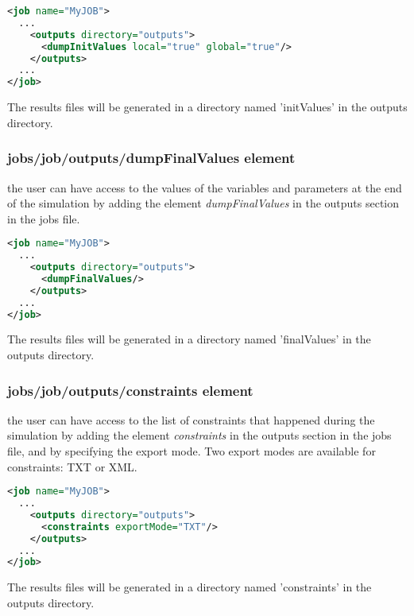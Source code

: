 \documentclass[a4paper, 12pt]{report}
\begin{document}
\begin{lstlisting}[language=XML, morekeywords={dumpInitValues},numbers=none]
<job name="MyJOB">
  ...
    <outputs directory="outputs">
      <dumpInitValues local="true" global="true"/>
    </outputs>
  ...
</job>
\end{lstlisting}

The results files will be generated in a directory named 'initValues' in the outputs directory.

\subsubsection{jobs/job/outputs/dumpFinalValues element}
\label{DynawoInputFiles_inputs_jobs_job_outputs_dumpFinalValues}

the user can have access to the values of the variables and parameters at the end of the simulation by adding the element \textit{dumpFinalValues} in the outputs section in the jobs file.


\begin{lstlisting}[language=XML, morekeywords={dumpFinalValues},numbers=none]
<job name="MyJOB">
  ...
    <outputs directory="outputs">
      <dumpFinalValues/>
    </outputs>
  ...
</job>
\end{lstlisting}

The results files will be generated in a directory named 'finalValues' in the outputs directory.

\subsubsection{jobs/job/outputs/constraints element}
\label{DynawoInputFiles_inputs_jobs_job_outputs_constraints}

the user can have access to the list of constraints that happened during the simulation by adding the element \textit{constraints} in the outputs section in the jobs file, and by specifying the export mode.
Two export modes are available for constraints: TXT or XML.

\begin{lstlisting}[language=XML, morekeywords={constraints},numbers=none]
<job name="MyJOB">
  ...
    <outputs directory="outputs">
      <constraints exportMode="TXT"/>
    </outputs>
  ...
</job>
\end{lstlisting}

The results files will be generated in a directory named 'constraints' in the outputs directory.
\end{document}
